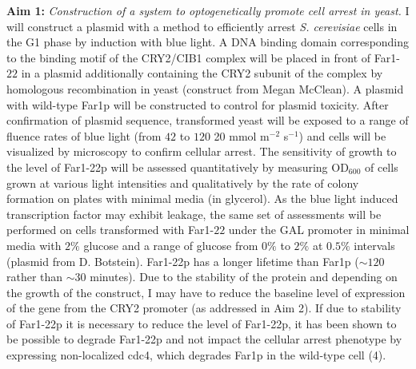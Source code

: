 \documentclass[12pt]{article}
\begin{document}
\textbf{Aim 1:} \emph{Construction of a system to optogenetically promote cell arrest in yeast.}
I will construct a plasmid with a method to efficiently arrest \emph{S. cerevisiae} cells in the G1 phase by induction with blue light. A DNA binding domain corresponding to the binding motif of the CRY2/CIB1 complex will be placed in front of Far1-$22$ in a plasmid additionally containing the CRY2 subunit of the complex by homologous recombination in yeast (construct from Megan McClean). A plasmid with wild-type Far1p will be constructed to control for plasmid toxicity. After confirmation of plasmid sequence, transformed yeast will be exposed to a range of fluence rates of blue light (from $42$ to $120$ 20 mmol m$^{−2}$ s$^{−1}$) and cells will be visualized by microscopy to confirm cellular arrest. The sensitivity of growth to the level of Far1-22p will be assessed quantitatively by measuring OD$_{600}$ of cells grown at various light intensities and qualitatively by the rate of colony formation on plates with minimal media (in glycerol). As the blue light induced transcription factor may exhibit leakage, the same set of assessments will be performed on cells transformed with Far1-$22$ under the GAL promoter in minimal media with $2\%$ glucose and a range of glucose from $0\%$ to $2\%$ at $0.5\%$ intervals (plasmid from D. Botstein).
Far1-22p has a longer lifetime than Far1p ($\sim 120$ rather than $\sim 30$ minutes). Due to the stability of the protein and depending on the growth of the construct, I may have to reduce the baseline level of expression of the gene from the CRY2 promoter (as addressed in Aim 2). If due to stability of Far1-22p it is necessary to reduce the level of Far1-22p, it has been shown to be possible to degrade Far1-22p and not impact the cellular arrest phenotype by expressing non-localized cdc4, which degrades Far1p in the wild-type cell (4).
\end{document}

